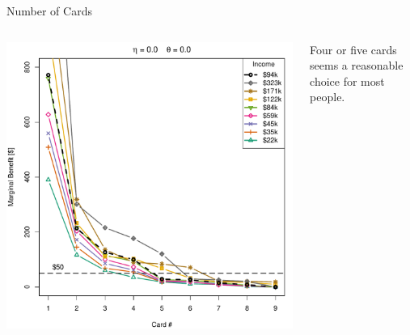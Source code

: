 \begin{frame}{Number of Cards}
    \begin{columns}[c]
        \begin{column}{0.7\textwidth}
            \includegraphics[width=0.9\textheight]{../Figures/MBvsKvsIncome_0_0.pdf}
        \end{column}
        \begin{column}{0.3\textwidth}
            \centering
            Four or five cards seems a reasonable choice for most people.
        \end{column}
    \end{columns}
\end{frame} 

